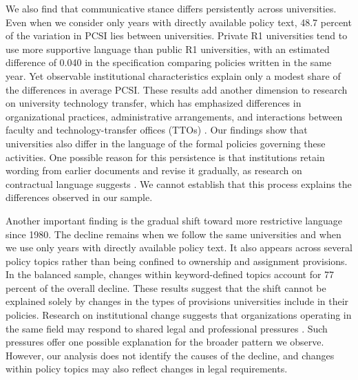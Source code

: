 \documentclass[11pt]{article}
\begin{document}
We also find that communicative stance differs persistently across universities. Even when we consider only years with directly available policy text, 48.7 percent of the variation in PCSI lies between universities. Private R1 universities tend to use more supportive language than public R1 universities, with an estimated difference of 0.040 in the specification comparing policies written in the same year. Yet observable institutional characteristics explain only a modest share of the differences in average PCSI. These results add another dimension to research on university technology transfer, which has emphasized differences in organizational practices, administrative arrangements, and interactions between faculty and technology-transfer offices (TTOs) \citep{jensen2003disclosure,siegel2003assessing,owensmith2001patent}. Our findings show that universities also differ in the language of the formal policies governing these activities. One possible reason for this persistence is that institutions retain wording from earlier documents and revise it gradually, as research on contractual language suggests \citep{kahan1997standardization,choi2013dynamics}. We cannot establish that this process explains the differences observed in our sample.

Another important finding is the gradual shift toward more restrictive language since 1980. The decline remains when we follow the same universities and when we use only years with directly available policy text. It also appears across several policy topics rather than being confined to ownership and assignment provisions. In the balanced sample, changes within keyword-defined topics account for 77 percent of the overall decline. These results suggest that the shift cannot be explained solely by changes in the types of provisions universities include in their policies. Research on institutional change suggests that organizations operating in the same field may respond to shared legal and professional pressures \citep{dimaggio1983iron,edelman1992legal}. Such pressures offer one possible explanation for the broader pattern we observe. However, our analysis does not identify the causes of the decline, and changes within policy topics may also reflect changes in legal requirements.
\end{document}
